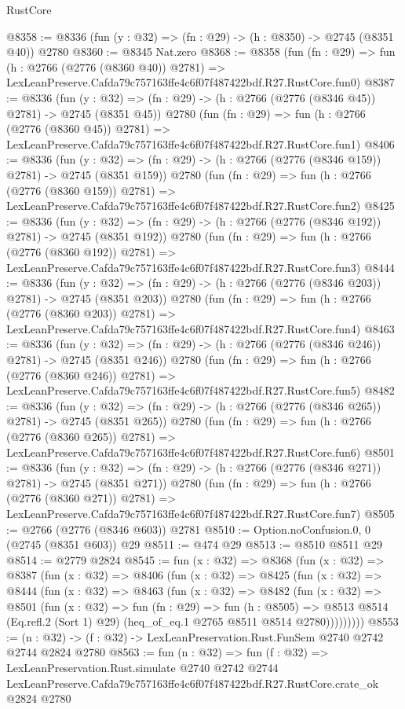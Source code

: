 \begin{lexlean}{RustCore}
\begin{coremodule}
@8358 := @8336 (fun (y : @32) => (fn : @29) -> (h : @8350) -> @2745 (@8351 @40)) @2780
@8360 := @8345 Nat.zero
@8368 := @8358
    (fun (fn : @29) =>
    fun (h : @2766 (@2776 (@8360 @40)) @2781) =>
    LexLeanPreserve.Cafda79c757163ffe4c6f07f487422bdf.R27.RustCore.fun0)
@8387 := @8336
    (fun (y : @32) => (fn : @29) -> (h : @2766 (@2776 (@8346 @45)) @2781) -> @2745 (@8351 @45))
    @2780
    (fun (fn : @29) =>
    fun (h : @2766 (@2776 (@8360 @45)) @2781) =>
    LexLeanPreserve.Cafda79c757163ffe4c6f07f487422bdf.R27.RustCore.fun1)
@8406 := @8336
    (fun (y : @32) => (fn : @29) -> (h : @2766 (@2776 (@8346 @159)) @2781) -> @2745 (@8351 @159))
    @2780
    (fun (fn : @29) =>
    fun (h : @2766 (@2776 (@8360 @159)) @2781) =>
    LexLeanPreserve.Cafda79c757163ffe4c6f07f487422bdf.R27.RustCore.fun2)
@8425 := @8336
    (fun (y : @32) => (fn : @29) -> (h : @2766 (@2776 (@8346 @192)) @2781) -> @2745 (@8351 @192))
    @2780
    (fun (fn : @29) =>
    fun (h : @2766 (@2776 (@8360 @192)) @2781) =>
    LexLeanPreserve.Cafda79c757163ffe4c6f07f487422bdf.R27.RustCore.fun3)
@8444 := @8336
    (fun (y : @32) => (fn : @29) -> (h : @2766 (@2776 (@8346 @203)) @2781) -> @2745 (@8351 @203))
    @2780
    (fun (fn : @29) =>
    fun (h : @2766 (@2776 (@8360 @203)) @2781) =>
    LexLeanPreserve.Cafda79c757163ffe4c6f07f487422bdf.R27.RustCore.fun4)
@8463 := @8336
    (fun (y : @32) => (fn : @29) -> (h : @2766 (@2776 (@8346 @246)) @2781) -> @2745 (@8351 @246))
    @2780
    (fun (fn : @29) =>
    fun (h : @2766 (@2776 (@8360 @246)) @2781) =>
    LexLeanPreserve.Cafda79c757163ffe4c6f07f487422bdf.R27.RustCore.fun5)
@8482 := @8336
    (fun (y : @32) => (fn : @29) -> (h : @2766 (@2776 (@8346 @265)) @2781) -> @2745 (@8351 @265))
    @2780
    (fun (fn : @29) =>
    fun (h : @2766 (@2776 (@8360 @265)) @2781) =>
    LexLeanPreserve.Cafda79c757163ffe4c6f07f487422bdf.R27.RustCore.fun6)
@8501 := @8336
    (fun (y : @32) => (fn : @29) -> (h : @2766 (@2776 (@8346 @271)) @2781) -> @2745 (@8351 @271))
    @2780
    (fun (fn : @29) =>
    fun (h : @2766 (@2776 (@8360 @271)) @2781) =>
    LexLeanPreserve.Cafda79c757163ffe4c6f07f487422bdf.R27.RustCore.fun7)
@8505 := @2766 (@2776 (@8346 @603)) @2781
@8510 := Option.noConfusion.{0, 0} (@2745 (@8351 @603)) @29
@8511 := @474 @29
@8513 := @8510 @8511 @29
@8514 := @2779 @2824
@8545 := fun (x : @32) =>
  @8368
    (fun (x : @32) =>
    @8387
      (fun (x : @32) =>
      @8406
        (fun (x : @32) =>
        @8425
          (fun (x : @32) =>
          @8444
            (fun (x : @32) =>
            @8463
              (fun (x : @32) =>
              @8482
                (fun (x : @32) =>
                @8501
                  (fun (x : @32) =>
                  fun (fn : @29) =>
                  fun (h : @8505) =>
                  @8513
                    @8514
                    (Eq.refl.{2} (Sort 1) @29)
                    (heq_of_eq.{1} @2765 @8511 @8514 @2780)))))))))
@8553 := (n : @32) -> (f : @32) -> LexLeanPreservation.Rust.FunSem @2740 @2742 @2744 @2824 @2780
@8563 := fun (n : @32) =>
  fun (f : @32) =>
  LexLeanPreservation.Rust.simulate
    @2740
    @2742
    @2744
    LexLeanPreserve.Cafda79c757163ffe4c6f07f487422bdf.R27.RustCore.crate_ok
    @2824
    @2780
\end{coremodule}
\end{lexlean}
